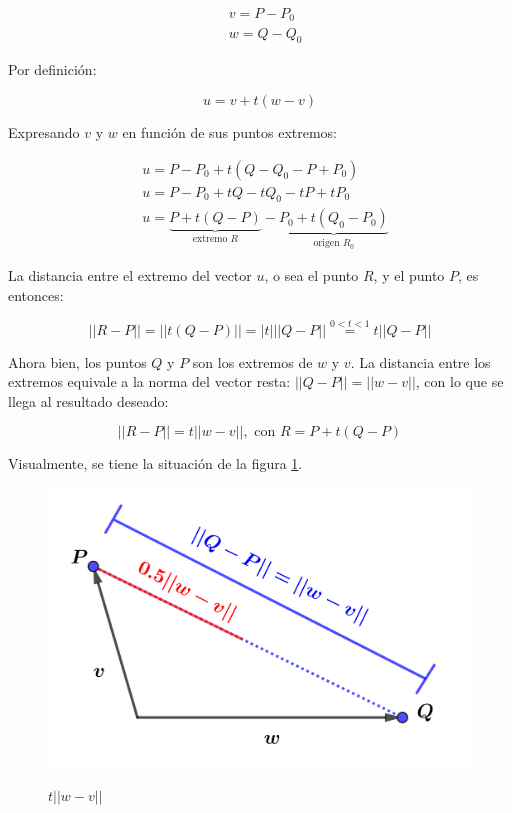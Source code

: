 \documentclass{article}
\begin{document}
\begin{equation}
\begin{array}{ll}
& v = P-P_0 \\
& w = Q-Q_0
\end{array}
\end{equation}

Por definición:

\begin{equation}
u = v + t (w-v)
\end{equation}

Expresando $v$ y $w$ en función de sus puntos extremos:

\begin{subequations}
\begin{align}
& u = P - P_0 + t (Q - Q_0 - P + P_0) \\
& u = P - P_0 + t Q - t Q_0 - t P + t P_0 \\
& u = \underbrace{ P + t (Q-P) }_{\text{extremo } R} - \underbrace{ P_0 + t (Q_0 - P_0) }_{\text{origen } R_0}
\end{align}
\end{subequations}

La distancia entre el extremo del vector $u$, o sea el punto $R$, y el punto $P$, es entonces:

\begin{equation}
||R-P|| = ||t (Q-P)|| = |t| ||Q - P|| \overset{0<t<1}{=} t ||Q-P||
\end{equation}

Ahora bien, los puntos $Q$ y $P$ son los extremos de $w$ y $v$. La distancia entre los extremos equivale a la norma del vector resta: $||Q-P|| = ||w-v||$, con lo que se llega al resultado deseado:

\begin{equation}
||R-P|| = t ||w-v||, \text{ con } R = P + t (Q-P)
\end{equation}

Visualmente, se tiene la situación de la figura \ref{fig:1-10-b}.  

\begin{figure}[ht]
\caption{$t ||w-v||$}
\includegraphics[scale=1]{img/ejercicios/1/10-b.png} 
\centering
\label{fig:1-10-b}
\end{figure}
\end{document}
